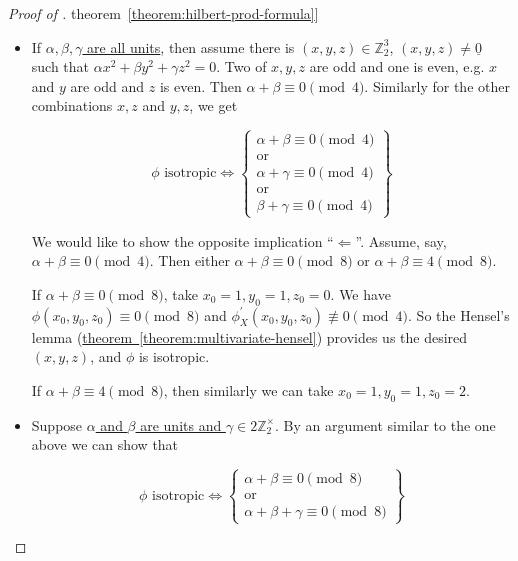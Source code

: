 \documentclass{article}
\newcommand{\ZZ}{\mathbb{Z}}
\newcommand{\refref}[2]{\hyperref[#2]{#1~\ref*{#2}}}
\theoremstyle{myplain}
\theoremstyle{mydefinition}
\begin{document}
\begin{proof}[Proof of \refref{theorem}{theorem:hilbert-prod-formula}]
\begin{enumerate}
    \begin{itemize}
    \item If \underline{$\alpha,\beta,\gamma$ are all units}, then assume there
      is $(x,y,z) \in \ZZ^3_2$, $(x,y,z) \ne \underline{0}$ such that
      $\alpha x^2 + \beta y^2 + \gamma z^2 = 0$. Two of $x,y,z$ are odd and one
      is even, e.g. $x$ and $y$ are odd and $z$ is even. Then
      $\alpha + \beta \equiv 0 \pmod{4}$. Similarly for the other combinations
      $x,z$ and $y,z$, we get

      \[ \phi \text{ isotropic} \iff
        \left\{\begin{array}{c}
                 \alpha + \beta \equiv 0 \pmod{4} \\
                 \text{or} \\
                 \alpha + \gamma \equiv 0 \pmod{4} \\
                 \text{or} \\
                 \beta + \gamma \equiv 0 \pmod{4}
               \end{array}\right\} \]

    We would like to show the opposite implication ``$\Leftarrow$''. Assume,
    say, $\alpha + \beta \equiv 0 \pmod{4}$. Then either
    $\alpha + \beta \equiv 0 \pmod{8}$ or $\alpha + \beta \equiv 4 \pmod{8}$.

    If $\alpha + \beta \equiv 0 \pmod{8}$, take $x_0 = 1, y_0 = 1, z_0 = 0$. We
    have $\phi (x_0,y_0,z_0) \equiv 0 \pmod{8}$ and
    $\phi^\prime_X (x_0,y_0,z_0) \not\equiv 0 \pmod{4}$. So the Hensel's lemma
    (\refref{theorem}{theorem:multivariate-hensel}) provides us the desired
    $(x,y,z)$, and $\phi$ is isotropic.

    If $\alpha + \beta \equiv 4 \pmod{8}$, then similarly we can take
    $x_0 = 1, y_0 = 1, z_0 = 2$.

  \item Suppose \underline{$\alpha$ and $\beta$ are units and
      $\gamma \in 2 \ZZ_2^\times$}. By an argument similar to the one above we
    can show that

    \[ \phi \text{ isotropic} \iff
      \left\{\begin{array}{c}
               \alpha + \beta \equiv 0 \pmod{8} \\
               \text{or} \\
               \alpha + \beta + \gamma \equiv 0 \pmod{8}
             \end{array}\right\} \]
  \end{itemize}


\end{enumerate}
\end{proof}
\end{document}
